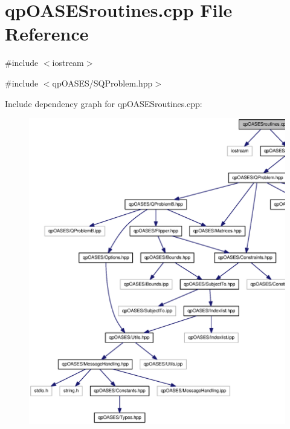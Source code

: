 \section{qpOASESroutines.cpp File Reference}
\label{qpOASESroutines_8cpp}
{\ttfamily \#include $<$iostream$>$}\par
{\ttfamily \#include $<$qpOASES/SQProblem.hpp$>$}\par
Include dependency graph for qpOASESroutines.cpp:
\nopagebreak
\begin{figure}[H]
\begin{center}
\leavevmode
\includegraphics[width=400pt]{qpOASESroutines_8cpp__incl}
\end{center}
\end{figure}
